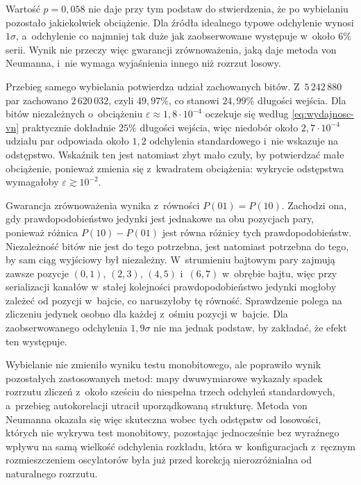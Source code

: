 Wartość $p = 0{,}058$ nie daje przy tym podstaw do stwierdzenia, że po wybielaniu
pozostało jakiekolwiek obciążenie. Dla źródła idealnego typowe odchylenie wynosi
$1\sigma$, a~odchylenie co najmniej tak duże jak zaobserwowane występuje w~około
$6\%$ serii. Wynik nie przeczy więc gwarancji zrównoważenia, jaką daje metoda
von Neumanna, i~nie wymaga wyjaśnienia innego niż rozrzut losowy.

Przebieg samego wybielania potwierdza udział zachowanych bitów. Z~$5\,242\,880$
par zachowano $2\,620\,032$, czyli $49{,}97\%$, co stanowi $24{,}99\%$ długości
wejścia. Dla bitów niezależnych o~obciążeniu $\varepsilon \approx 1{,}8 \cdot 10^{-4}$
oczekuje się według \eqref{eq:wydajnosc-vn} praktycznie dokładnie $25\%$ długości
wejścia, więc niedobór około $2{,}7 \cdot 10^{-4}$ udziału par odpowiada około
$1{,}2$ odchylenia standardowego i~nie wskazuje na odstępstwo. Wskaźnik ten jest
natomiast zbyt mało czuły, by potwierdzać małe obciążenie, ponieważ zmienia się
z~kwadratem obciążenia: wykrycie odstępstwa wymagałoby $\varepsilon \gtrsim 10^{-2}$.

Gwarancja zrównoważenia wynika z~równości $P(01) = P(10)$. Zachodzi ona, gdy
prawdopodobieństwo jedynki jest jednakowe na obu pozycjach pary, ponieważ różnica
$P(10) - P(01)$ jest równa różnicy tych prawdopodobieństw. Niezależność bitów nie
jest do tego potrzebna, jest natomiast potrzebna do tego, by sam ciąg wyjściowy
był niezależny. W~strumieniu bajtowym pary zajmują zawsze pozycje $(0,1)$,
$(2,3)$, $(4,5)$ i~$(6,7)$ w~obrębie bajtu, więc przy serializacji kanałów w~stałej
kolejności prawdopodobieństwo jedynki mogłoby zależeć od pozycji w~bajcie, co
naruszyłoby tę równość. Sprawdzenie polega na zliczeniu jedynek osobno dla każdej
z~ośmiu pozycji w~bajcie. Dla zaobserwowanego odchylenia $1{,}9\sigma$ nie ma
jednak podstaw, by zakładać, że efekt ten występuje.

Wybielanie nie zmieniło wyniku testu monobitowego, ale poprawiło wynik pozostałych
zastosowanych metod: mapy dwuwymiarowe wykazały spadek rozrzutu zliczeń z~około
sześciu do niespełna trzech odchyleń standardowych, a~przebieg autokorelacji
utracił uporządkowaną strukturę. Metoda von Neumanna okazała się więc skuteczna
wobec tych odstępstw od losowości, których nie wykrywa test monobitowy, pozostając
jednocześnie bez wyraźnego wpływu na samą wielkość odchylenia rozkładu, która
w~konfiguracjach z~ręcznym rozmieszczeniem oscylatorów była już przed korekcją
nierozróżnialna od naturalnego rozrzutu.

\FloatBarrier

